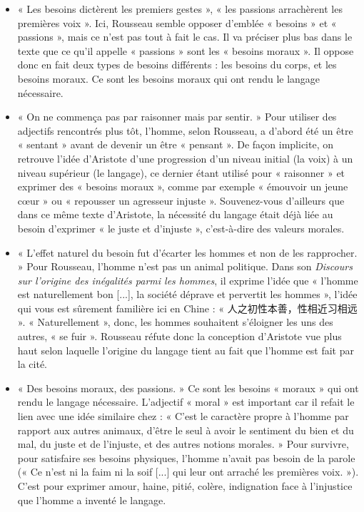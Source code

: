 \begin{itemize}
\item « Les besoins dictèrent les premiers gestes », « les passions arrachèrent les premières voix ». Ici, Rousseau semble opposer d’emblée « besoins » et « passions », mais ce n’est pas tout à fait le cas. Il va préciser plus bas dans le texte que ce qu’il appelle « passions » sont les « besoins moraux ». Il oppose donc en fait deux types de besoins différents : les besoins du corps, et les besoins moraux. Ce sont les besoins moraux qui ont rendu le langage nécessaire.
\item « On ne commença pas par raisonner mais par sentir. » Pour utiliser des adjectifs rencontrés plus tôt, l’homme, selon Rousseau, a d’abord été un être « sentant » avant de devenir un être « pensant ». De façon implicite, on retrouve l’idée d’Aristote d’une progression d’un niveau initial (la voix) à un niveau supérieur (le langage), ce dernier étant utilisé pour « raisonner » et exprimer des « besoins moraux », comme par exemple « émouvoir un jeune cœur » ou « repousser un agresseur injuste ». Souvenez-vous d’ailleurs que dans ce même texte d’Aristote, la nécessité du langage était déjà liée au besoin d’exprimer « le juste et d’injuste », c’est-à-dire des valeurs morales.
\item « L’effet naturel du besoin fut d’écarter les hommes et non de les rapprocher. » Pour Rousseau, l’homme n’est pas un animal politique. Dans son \textit{Discours sur l’origine des inégalités parmi les hommes}, il exprime l’idée que « l’homme est naturellement bon [...], la société déprave et pervertit les hommes », l’idée qui vous est sûrement familière ici en Chine : « 人之初性本善，性相近习相远 ». « Naturellement », donc, les hommes souhaitent s’éloigner les uns des autres, « se fuir ». Rousseau réfute donc la conception d’Aristote vue plus haut selon laquelle l’origine du langage tient au fait que l’homme est fait par la cité.
\item « Des besoins moraux, des passions. » Ce sont les besoins « moraux » qui ont rendu le langage nécessaire. L’adjectif « moral » est important car il refait le lien avec une idée similaire chez : « C’est le caractère propre à l’homme par rapport aux autres animaux, d’être le seul à avoir le sentiment du bien et du mal, du juste et de l’injuste, et des autres notions morales. » Pour survivre, pour satisfaire ses besoins physiques, l’homme n’avait pas besoin de la parole (« Ce n’est ni la faim ni la soif [...] qui leur ont arraché les premières voix. »). C’est pour exprimer amour, haine, pitié, colère, indignation face à l’injustice que l’homme a inventé le langage.
\end{itemize}
